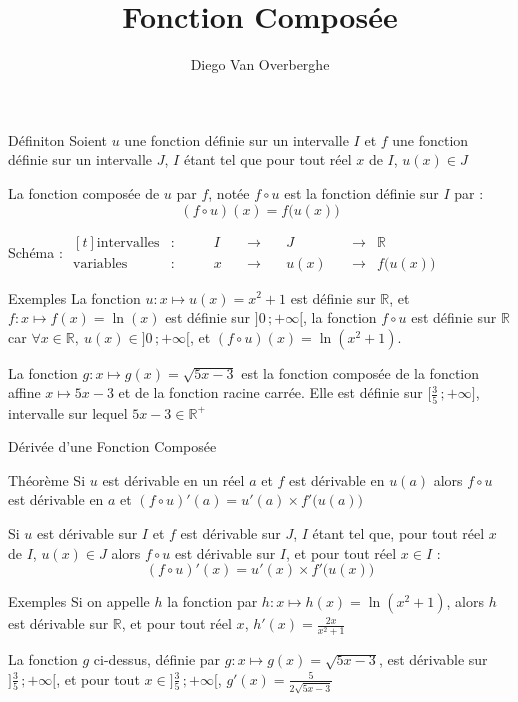\documentclass{cours}
\title{Fonction Composée}
\author{Diego Van Overberghe}
\begin{document}

    \begin{Gpartie}{Définiton} 
        Soient $u$ une fonction définie sur un intervalle $I$ et $f$ une fonction définie sur un intervalle $J$, $I$ étant tel que pour tout réel $x$ de $I$, $u(x)\in J$

        La fonction composée de $u$ par $f$, notée $f\circ u$ est la fonction définie sur $I$ par :
        \[(f\circ u)(x)=f\big(u(x)\big)\]

        Schéma : \qquad
        $\begin{aligned}[t]
            \text{intervalles} &: \qquad &I\quad&\rightarrow &J\quad&\rightarrow &\mathbb{R}\\
            \text{variables} &: \qquad &x\quad&\rightarrow\quad &u(x)\quad&\rightarrow &f\big(u(x)\big)
        \end{aligned}$
        \vspace{2ex}
        \begin{Spartie}{Exemples} 
            La fonction $u:x\mapsto u(x)=x^2+1$ est définie sur $\mathbb{R}$, et $f:x\mapsto f(x)=\ln(x)$ est définie sur $\big]0\,;+\infty\big[$, la fonction $f\circ u$ est définie sur $\mathbb{R}$ car $\forall x\in\mathbb{R},\ u(x)\in\big]0\,;+\infty\big[$, et $(f\circ u)(x)=\ln(x^2+1)$.

            La fonction $g:x\mapsto g(x)=\sqrt{5x-3}$ est la fonction composée de la fonction affine $x\mapsto 5x-3$ et de la fonction racine carrée. Elle est définie sur $\Big[\frac{3}{5}\,;+\infty\Big]$, intervalle sur lequel $5x-3\in\mathbb{R^{+}}$
        \end{Spartie}
    \end{Gpartie}
    \begin{Gpartie}{Dérivée d'une Fonction Composée} 
        \begin{Spartie}{Théorème} 
            Si $u$ est dérivable en un réel $a$ et $f$ est dérivable en $u(a)$ alors $f\circ u$ est dérivable en $a$ et $(f\circ u)'(a)=u'(a)\times f'\big(u(a)\big)$

            Si $u$ est dérivable sur $I$ et $f$ est dérivable sur $J$, $I$ étant tel que, pour tout réel $x$ de $I$, $u(x)\in J$ alors $f\circ u$ est dérivable sur $I$, et pour tout réel $x\in I$ : \[(f\circ u)'(x)=u'(x)\times f'\big(u(x)\big)\] 
        \end{Spartie}
        \begin{Spartie}{Exemples} 
            Si on appelle $h$ la fonction par $h:x\mapsto h(x)=\ln(x^2+1)$, alors $h$ est dérivable sur $\mathbb{R}$, et pour tout réel $x$, $h'(x)=\frac{2x}{x^2+1}$

            La fonction $g$ ci-dessus, définie par $g:x\mapsto g(x)=\sqrt{5x-3}$, est dérivable sur $\Big]\frac{3}{5}\,;+\infty\Big[$, et pour tout $x\in\Big]\frac{3}{5}\,;+\infty\Big[$, $g'(x)=\frac{5}{2\sqrt{5x-3}}$
        \end{Spartie}
    \end{Gpartie}
\end{document}
